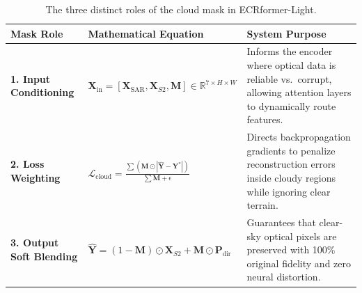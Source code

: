 \begin{table}[htbp]
\centering
\small
\begin{tabularx}{\textwidth}{lp{4.2cm}X}
\toprule
\textbf{Mask Role} & \textbf{Mathematical Equation} & \textbf{System Purpose} \\
\midrule
\textbf{1. Input Conditioning} & $\mathbf{X}_{\text{in}} = [\mathbf{X}_{\text{SAR}}, \mathbf{X}_{S2}, \mathbf{M}] \in \mathbb{R}^{7 \times H \times W}$ & Informs the encoder where optical data is reliable vs.\ corrupt, allowing attention layers to dynamically route features. \\
\textbf{2. Loss Weighting} & $\mathcal{L}_{\text{cloud}} = \frac{\sum (\mathbf{M} \odot |\hat{\mathbf{Y}} - \mathbf{Y}^*|)}{\sum \mathbf{M} + \epsilon}$ & Directs backpropagation gradients to penalize reconstruction errors inside cloudy regions while ignoring clear terrain. \\
\textbf{3. Output Soft Blending} & $\hat{\mathbf{Y}} = (1 - \mathbf{M}) \odot \mathbf{X}_{S2} + \mathbf{M} \odot \mathbf{P}_{\text{dir}}$ & Guarantees that clear-sky optical pixels are preserved with 100\% original fidelity and zero neural distortion. \\
\bottomrule
\end{tabularx}
\caption{The three distinct roles of the cloud mask in ECRformer-Light.}
\label{tab:mask_roles}
\end{table}

